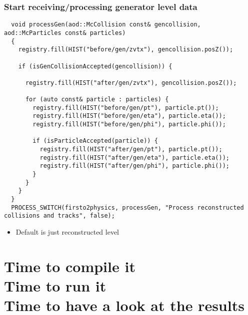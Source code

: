 \documentclass[14pt,aspectratio=169,t]{beamer}
\begin{document}
\begin{frame}[fragile]
  \frametitle{Start receiving/processing generator level data}
  {\tiny\color{blue}
  \vspace{-0.0in}
  \begin{verbatim}
  void processGen(aod::McCollision const& gencollision, aod::McParticles const& particles)
  {
    registry.fill(HIST("before/gen/zvtx"), gencollision.posZ());

    if (isGenCollisionAccepted(gencollision)) {

      registry.fill(HIST("after/gen/zvtx"), gencollision.posZ());

      for (auto const& particle : particles) {
        registry.fill(HIST("before/gen/pt"), particle.pt());
        registry.fill(HIST("before/gen/eta"), particle.eta());
        registry.fill(HIST("before/gen/phi"), particle.phi());

        if (isParticleAccepted(particle)) {
          registry.fill(HIST("after/gen/pt"), particle.pt());
          registry.fill(HIST("after/gen/eta"), particle.eta());
          registry.fill(HIST("after/gen/phi"), particle.phi());
        }
      }
    }
  }
  PROCESS_SWITCH(firsto2physics, processGen, "Process reconstructed collisions and tracks", false);
  \end{verbatim}}
  \vspace{-0.3in}
  \begin{itemize}
    \small
    \item Default is just reconstructed level
  \end{itemize}
\end{frame}

\section{Time to compile it\\Time to run it\\Time to have a look at the results}
\end{document}
